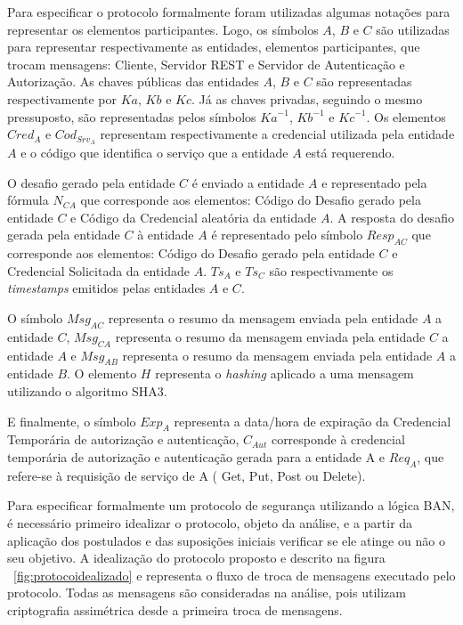 Para especificar o protocolo formalmente foram utilizadas algumas notações para representar os elementos participantes. Logo, os símbolos ${A}$, ${B}$ e ${C}$ são utilizadas para representar respectivamente as entidades, elementos participantes, que trocam mensagens: Cliente, Servidor REST e Servidor de Autenticação e Autorização. As chaves públicas das entidades ${A}$, ${B}$ e ${C}$ são representadas respectivamente por ${Ka}$, ${Kb}$ e  ${Kc}$. Já as chaves privadas, seguindo o mesmo pressuposto, são representadas pelos símbolos ${{Ka} ^{-1}}$, ${{Kb} ^{-1}}$ e ${{Kc} ^{-1}}$. Os elementos ${Cred_A}$ e ${Cod_{Srv_A}}$ representam respectivamente a credencial utilizada pela entidade ${A}$ e o código que identifica o serviço que a entidade ${A}$ está requerendo.

O desafio gerado pela entidade ${C}$ é enviado a entidade ${A}$ e representado pela fórmula ${N_{CA}}$ que corresponde aos elementos: Código do Desafio gerado pela entidade ${C}$ e Código da Credencial aleatória da entidade ${A}$. A resposta do desafio gerada pela entidade ${C}$ à entidade ${A}$ é representado  pelo símbolo ${Resp_{AC}}$ que corresponde aos elementos: Código do Desafio gerado pela entidade ${C}$ e Credencial Solicitada da entidade ${A}$. ${Ts_A}$ e ${Ts_C}$ são respectivamente os \emph{timestamps} emitidos pelas entidades ${A}$ e ${C}$.

O símbolo ${Msg_{AC}}$ representa o resumo da mensagem enviada pela entidade ${A}$ a entidade ${C}$,  ${Msg_{CA}}$ representa o resumo da mensagem enviada pela entidade ${C}$ a entidade ${A}$ e ${Msg_{AB}}$ representa o resumo da mensagem enviada pela entidade ${A}$ a entidade ${B}$. O elemento ${H}$ representa o \emph{hashing} aplicado a uma mensagem utilizando o algoritmo SHA3.

E finalmente, o símbolo ${Exp_A}$ representa a data/hora  de expiração da Credencial Temporária de autorização e autenticação, ${C_{Aut}}$ corresponde à credencial temporária de autorização e autenticação gerada para a entidade A e ${Req_A}$, que refere-se à requisição de serviço de A ( Get, Put, Post ou Delete).

Para especificar formalmente um protocolo de segurança utilizando a lógica BAN, é necessário primeiro idealizar o protocolo, objeto da análise, e a partir da aplicação dos postulados e das suposições iniciais verificar se ele atinge ou não o seu objetivo. A idealização do protocolo proposto e descrito na figura ~\ref{fig:protocoidealizado} e representa o fluxo de troca de mensagens executado pelo protocolo. Todas as mensagens são consideradas na análise, pois utilizam criptografia assimétrica desde a primeira troca de mensagens.

